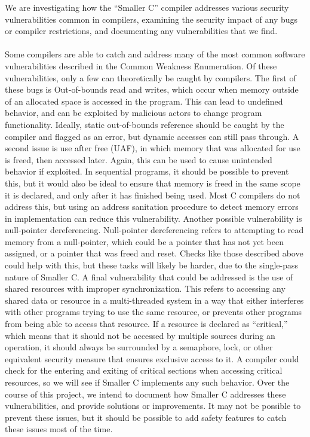\documentclass[sigconf, anonymous]{acmart}
\begin{document}
We are investigating how the “Smaller C” compiler addresses various security vulnerabilities common in compilers, examining the security impact of any bugs or compiler restrictions, and documenting any vulnerabilities that we find.
\\\\
Some compilers are able to catch and address many of the most common software vulnerabilities described in the Common Weakness Enumeration.\cite{CWE:2023} Of these vulnerabilities, only a few can theoretically be caught by compilers. The first of these bugs is Out-of-bounds read and writes, which occur when memory outside of an allocated space is accessed in the program. This can lead to undefined behavior, and can be exploited by malicious actors to change program functionality. Ideally, static out-of-bounds reference should be caught by the compiler and flagged as an error, but dynamic accesses can still pass through. A second issue is use after free (UAF), in which memory that was allocated for use is freed, then accessed later. Again, this can be used to cause unintended behavior if exploited. In sequential programs, it should be possible to prevent this, but it would also be ideal to ensure that memory is freed in the same scope it is declared, and only after it has finished being used. Most C compilers do not address this, but using an address sanitation procedure to detect memory errors in implementation can reduce this vulnerability. Another possible vulnerability is null-pointer dereferencing. Null-pointer dereferencing refers to attempting to read memory from a null-pointer, which could be a pointer that has not yet been assigned, or a pointer that was freed and reset. Checks like those described above could help with this, but these tasks will likely be harder, due to the single-pass nature of Smaller C. A final vulnerability that could be addressed is the use of shared resources with improper synchronization. This refers to accessing any shared data or resource in a multi-threaded system in a way that either interferes with other programs trying to use the same resource, or prevents other programs from being able to access that resource. If a resource is declared as “critical,” which means that it should not be accessed by multiple sources during an operation, it should always be surrounded by a semaphore, lock, or other equivalent security measure that ensures exclusive access to it. A compiler could check for the entering and exiting of critical sections when accessing critical resources, so we will see if Smaller C implements any such behavior. Over the course of this project, we intend to document how Smaller C addresses these vulnerabilities, and provide solutions or improvements. It may not be possible to prevent these issues, but it should be possible to add safety features to catch these issues most of the time.
\end{document}
